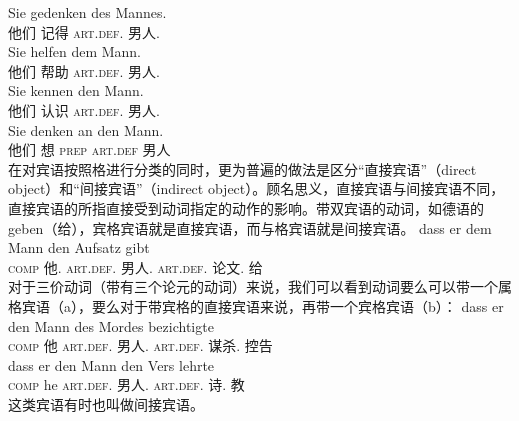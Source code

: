 \eal
\ex 
\gll Sie gedenken des Mannes.\\
	 他们 记得 \textsc{art}.\textsc{def}.\gen{} 男人.\gen{}\\
\ex 
\gll Sie helfen dem Mann.\\
	 他们 帮助 \textsc{art}.\textsc{def}.\dat{} 男人.\dat{}\\
\ex 
\gll Sie kennen den Mann.\\
	 他们 认识 \textsc{art}.\textsc{def}.\acc{} 男人.\acc{}\\
\ex 
\gll Sie denken an den Mann.\\
	 他们 想 \textsc{prep} \textsc{art}.\textsc{def} 男人\\
\zl
在对宾语按照格进行分类的同时，更为普遍的做法是区分“直接宾语”（direct object）和“间接宾语”（indirect object）。顾名思义，直接宾语与间接宾语不同，直接宾语的所指直接受到动词指定的动作的影响。带双宾语的动词，如德语的geben（给），宾格宾语就是直接宾语，而与格宾语就是间接宾语。
\ea
\gll dass er dem Mann den Aufsatz gibt\\
	 \textsc{comp} 他.\nom{} \textsc{art}.\textsc{def}.\dat{} 男人.\dat{} \textsc{art}.\textsc{def}.\acc{} 论文.\acc{} 给\\
\z
对于三价动词（带有三个论元的动词）来说，我们可以看到动词要么可以带一个属格宾语（a），要么对于带宾格的直接宾语来说，再带一个宾格宾语（b）：
\eal
\ex 
\gll dass er den Mann des Mordes bezichtigte\\
	 \textsc{comp} 他 \textsc{art}.\textsc{def}.\acc{} 男人.\acc{} \textsc{art}.\textsc{def}.\gen{} 谋杀.\gen{} 控告\\
\ex 
\gll dass er den Mann den Vers lehrte\\
	 \textsc{comp} he \textsc{art}.\textsc{def}.\acc{} 男人.\acc{} \textsc{art}.\textsc{def}.\acc{} 诗.\acc{} 教\\
\zl
这类宾语有时也叫做间接宾语。

